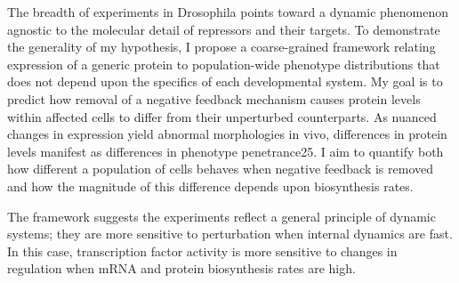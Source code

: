The breadth of experiments in Drosophila points toward a dynamic phenomenon agnostic to the molecular detail of repressors and their targets. To demonstrate the generality of my hypothesis, I propose a coarse-grained framework relating expression of a generic protein to population-wide phenotype distributions that does not depend upon the specifics of each developmental system. My goal is to predict how removal of a negative feedback mechanism causes protein levels within affected cells to differ from their unperturbed counterparts. As nuanced changes in expression yield abnormal morphologies in vivo, differences in protein levels manifest as differences in phenotype penetrance25. I aim to quantify both how different a population of cells behaves when negative feedback is removed and how the magnitude of this difference depends upon biosynthesis rates.

The framework suggests the experiments reflect a general principle of dynamic systems; they are more sensitive to perturbation when internal dynamics are fast. In this case, transcription factor activity is more sensitive to changes in regulation when mRNA and protein biosynthesis rates are high.
